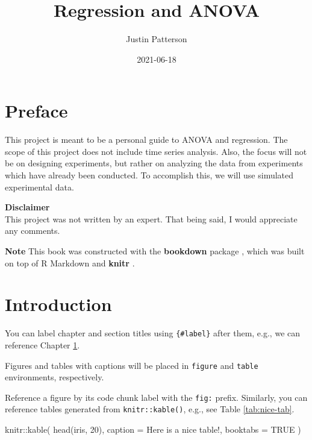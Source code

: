 \documentclass[
]{book}
\title{Regression and ANOVA}
\author{Justin Patterson}
\date{2021-06-18}
\newenvironment{Shaded}{\begin{snugshade}}{\end{snugshade}}
\newcommand{\AttributeTok}[1]{\textcolor[rgb]{0.77,0.63,0.00}{#1}}
\newcommand{\ConstantTok}[1]{\textcolor[rgb]{0.00,0.00,0.00}{#1}}
\newcommand{\DecValTok}[1]{\textcolor[rgb]{0.00,0.00,0.81}{#1}}
\newcommand{\FunctionTok}[1]{\textcolor[rgb]{0.00,0.00,0.00}{#1}}
\newcommand{\NormalTok}[1]{#1}
\newcommand{\SpecialCharTok}[1]{\textcolor[rgb]{0.00,0.00,0.00}{#1}}
\newcommand{\StringTok}[1]{\textcolor[rgb]{0.31,0.60,0.02}{#1}}
\begin{document}
\maketitle

{
\setcounter{tocdepth}{1}
\tableofcontents
}
\hypertarget{preface}{%
\chapter*{Preface}\label{preface}}

This project is meant to be a personal guide to ANOVA and regression. The scope of this project does not include time series analysis. Also, the focus will not be on designing experiments, but rather on analyzing the data from experiments which have already been conducted. To accomplish this, we will use simulated experimental data.

\textbf{Disclaimer}\\
This project was not written by an expert. That being said, I would appreciate any comments.

\textbf{Note}
This book was constructed with the \textbf{bookdown} package \autocite{R-bookdown}, which was built on top of R Markdown and \textbf{knitr} \autocite{xie2015}.

\hypertarget{intro}{%
\chapter{Introduction}\label{intro}}

You can label chapter and section titles using \texttt{\{\#label\}} after them, e.g., we can reference Chapter \ref{intro}.

Figures and tables with captions will be placed in \texttt{figure} and \texttt{table} environments, respectively.

Reference a figure by its code chunk label with the \texttt{fig:} prefix. Similarly, you can reference tables generated from \texttt{knitr::kable()}, e.g., see Table \ref{tab:nice-tab}.

\begin{Shaded}
\begin{Highlighting}[]
\NormalTok{knitr}\SpecialCharTok{::}\FunctionTok{kable}\NormalTok{(}
  \FunctionTok{head}\NormalTok{(iris, }\DecValTok{20}\NormalTok{), }\AttributeTok{caption =} \StringTok{\textquotesingle{}Here is a nice table!\textquotesingle{}}\NormalTok{,}
  \AttributeTok{booktabs =} \ConstantTok{TRUE}
\NormalTok{)}
\end{Highlighting}
\end{Shaded}
\end{document}
